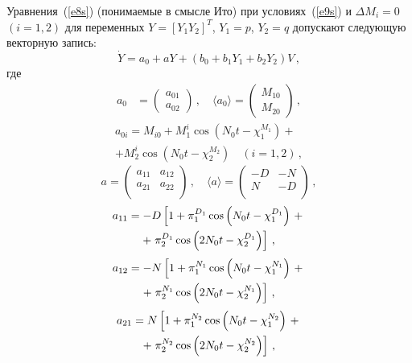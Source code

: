 \begin{multicols}{2}
Уравнения~(\ref{e8s}) (понимаемые в смысле Ито) при условиях~(\ref{e9s}) и
$\Delta M_i =0$ $(i=1,2)$ для переменных $Y= [ Y_1 Y_2]^T$, $
Y_1 = p$, $ Y_2 = q$ допускают следующую векторную запись:
\begin{equation*}
\dot Y = a_0 + a Y + (b_0 + b_1Y_1+ b_2 Y_2) V\,,\label{e50s}
\end{equation*}
где
\begin{align}
a_0&=
\begin{pmatrix}
 a_{01}\\ a_{02}
 \end{pmatrix}\,,
 \quad \langle a_0 \rangle =
 \begin{pmatrix}
 M_{10}\\ M_{20}\end{pmatrix}\,,\label{e51s}
 \end{align}
\begin{multline*}
a_{0i} = M_{i0} + M_1^i \cos \left(N_0 t -\chi_1^{M_1}\right) +{}\\
+ M_2^i \cos \left(N_0 t -\chi_2^{M_2}\right)\quad  (i=1,2)\,,
\end{multline*}
 \begin{equation}
a =\begin{pmatrix}
 a_{11}&a_{12}\\ a_{21}& a_{22}\\
 \end{pmatrix}\,, \quad \langle a \rangle =
 \begin{pmatrix}
 -D&-N\\ N&-D\\
 \end{pmatrix}\,,\label{e52s}
 \end{equation}
\begin{multline*}
a_{11} =-D\left[ 1 + \pi_1^{D_1} \cos \left(N_0t -\chi_1^{D_1}\right)\right. +{}\notag\\
+\left. \pi_2^{D_1} \cos \left(2N_0t -\chi_2^{D_1}\right)\right]\,,\notag
\end{multline*}
\begin{multline*}
a_{12} =-N\left[ 1 + \pi_1^{N_1} \cos \left(N_0t -\chi_1^{N_1}\right)\right. +{}\notag\\
+ \left.\pi_2^{N_1} \cos \left(2N_0t -\chi_2^{N_1}\right)\right]\,,\notag
\end{multline*}
\begin{multline*}
a_{21} =N\left[ 1 + \pi_1^{N_2} \cos \left(N_0t -\chi_1^{N_2}\right) \right.+{}\notag\\
+ \left.\pi_2^{N_2} \cos \left(2N_0t -\chi_2^{N_2}\right)\right]\,,\notag

\end{multline*}
\end{multicols}
